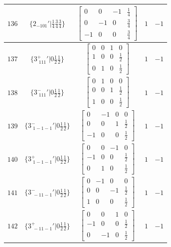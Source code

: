\documentclass[fleqn,8pt]{jsarticle}
\begin{document}
\begin{longtable}{ccccc}
$ 136 $ & $ \{2{}_{-101}{}'|\frac{1}{4} \frac{3}{4} \frac{3}{4}\} $ & $ \begin{bmatrix} 0 & 0 & -1 & \frac{1}{4} \\ 0 & -1 & 0 & \frac{3}{4} \\ -1 & 0 & 0 & \frac{3}{4} \end{bmatrix} $ & $ 1 $ & $ -1 $ \\ \hline
$ 137 $ & $ \{3^{+}_{\,\,111}{}'|0 \frac{1}{2} \frac{1}{2}\} $ & $ \begin{bmatrix} 0 & 0 & 1 & 0 \\ 1 & 0 & 0 & \frac{1}{2} \\ 0 & 1 & 0 & \frac{1}{2} \end{bmatrix} $ & $ 1 $ & $ -1 $ \\ \hline
$ 138 $ & $ \{3^{-}_{\,\,111}{}'|0 \frac{1}{2} \frac{1}{2}\} $ & $ \begin{bmatrix} 0 & 1 & 0 & 0 \\ 0 & 0 & 1 & \frac{1}{2} \\ 1 & 0 & 0 & \frac{1}{2} \end{bmatrix} $ & $ 1 $ & $ -1 $ \\ \hline
$ 139 $ & $ \{3^{-}_{\,\,1-1-1}{}'|0 \frac{1}{2} \frac{1}{2}\} $ & $ \begin{bmatrix} 0 & -1 & 0 & 0 \\ 0 & 0 & 1 & \frac{1}{2} \\ -1 & 0 & 0 & \frac{1}{2} \end{bmatrix} $ & $ 1 $ & $ -1 $ \\ \hline
$ 140 $ & $ \{3^{+}_{\,\,1-1-1}{}'|0 \frac{1}{2} \frac{1}{2}\} $ & $ \begin{bmatrix} 0 & 0 & -1 & 0 \\ -1 & 0 & 0 & \frac{1}{2} \\ 0 & 1 & 0 & \frac{1}{2} \end{bmatrix} $ & $ 1 $ & $ -1 $ \\ \hline
$ 141 $ & $ \{3^{-}_{\,\,-11-1}{}'|0 \frac{1}{2} \frac{1}{2}\} $ & $ \begin{bmatrix} 0 & -1 & 0 & 0 \\ 0 & 0 & -1 & \frac{1}{2} \\ 1 & 0 & 0 & \frac{1}{2} \end{bmatrix} $ & $ 1 $ & $ -1 $ \\ \hline
$ 142 $ & $ \{3^{+}_{\,\,-11-1}{}'|0 \frac{1}{2} \frac{1}{2}\} $ & $ \begin{bmatrix} 0 & 0 & 1 & 0 \\ -1 & 0 & 0 & \frac{1}{2} \\ 0 & -1 & 0 & \frac{1}{2} \end{bmatrix} $ & $ 1 $ & $ -1 $ \\ \hline

\end{longtable}
\end{document}

